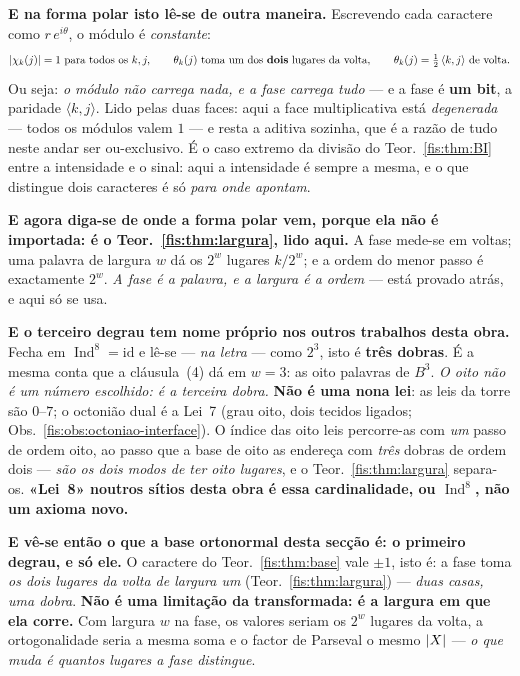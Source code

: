 \documentclass[livro.tex]{subfiles}
\begin{document}
\medskip\noindent\textbf{E na forma polar isto lê-se de outra maneira.}
Escrevendo cada caractere como $r\,e^{i\theta}$, o módulo é
\emph{constante}:
\[
\lvert \chi_k(j)\rvert=1\ \text{para todos os }k,j,
\qquad
\theta_k(j)\ \text{toma um dos \textbf{dois} lugares da volta},\qquad
\theta_k(j)=\tfrac12\,\langle k,j\rangle\ \text{de volta}.
\]
Ou seja: \emph{o módulo não carrega nada, e a fase carrega tudo} --- e a fase é
\textbf{um bit}, a paridade $\langle k,j\rangle$. Lido pelas duas faces: aqui a
face multiplicativa está \emph{degenerada} --- todos os módulos valem $1$ --- e
resta a aditiva sozinha, que é a razão de tudo neste andar ser ou-exclusivo. É o
caso extremo da divisão do Teor.~\ref{fis:thm:BI} entre a intensidade e o sinal:
aqui a intensidade é sempre a mesma, e o que distingue dois caracteres é só
\emph{para onde apontam}.


\medskip\noindent\textbf{E agora diga-se de onde a forma polar vem, porque ela
não é importada: é o Teor.~\ref{fis:thm:largura}, lido aqui.} A fase mede-se em
voltas; uma palavra de largura $w$ dá os $2^{w}$ lugares $k/2^{w}$; e a ordem do
menor passo é exactamente $2^{w}$. \emph{A fase é a palavra, e a largura é a
ordem} --- está provado atrás, e aqui só se usa.

\medskip\noindent\textbf{E o terceiro degrau tem nome próprio nos outros
trabalhos desta obra.} Fecha em $\operatorname{Ind}^{8}=\mathrm{id}$ e lê-se
--- \emph{na letra} --- como $2^{3}$, isto é \textbf{três dobras}. É a mesma
conta que a cláusula~(4) dá em $w=3$: as oito palavras de $B^{3}$. \emph{O oito
não é um número escolhido: é a terceira dobra.} \textbf{Não é uma nona lei}: as
leis da torre são $0$--$7$; o octonião dual é a Lei~7 (grau oito, dois tecidos
ligados; Obs.~\ref{fis:obs:octoniao-interface}). O índice das oito leis
percorre-as com \emph{um} passo de ordem oito, ao passo que a base de oito as
endereça com \emph{três} dobras de ordem dois --- \emph{são os dois modos de ter
oito lugares}, e o Teor.~\ref{fis:thm:largura} separa-os. \textbf{«Lei~8» noutros
sítios desta obra é essa cardinalidade, ou $\operatorname{Ind}^{8}$, não um
axioma novo.}

\medskip\noindent\textbf{E vê-se então o que a base ortonormal desta secção é: o
primeiro degrau, e só ele.} O caractere do Teor.~\ref{fis:thm:base} vale
$\pm1$, isto é: a fase toma \emph{os dois lugares da volta de largura um}
(Teor.~\ref{fis:thm:largura}) --- \emph{duas casas, uma
dobra}. \textbf{Não é uma limitação da transformada: é a largura em que ela
corre.} Com largura $w$ na fase, os valores seriam os $2^{w}$ lugares da volta, a
ortogonalidade seria a mesma soma e o factor de Parseval o mesmo $\lvert X\rvert$ ---
\emph{o que muda é quantos lugares a fase distingue}.
\end{document}
